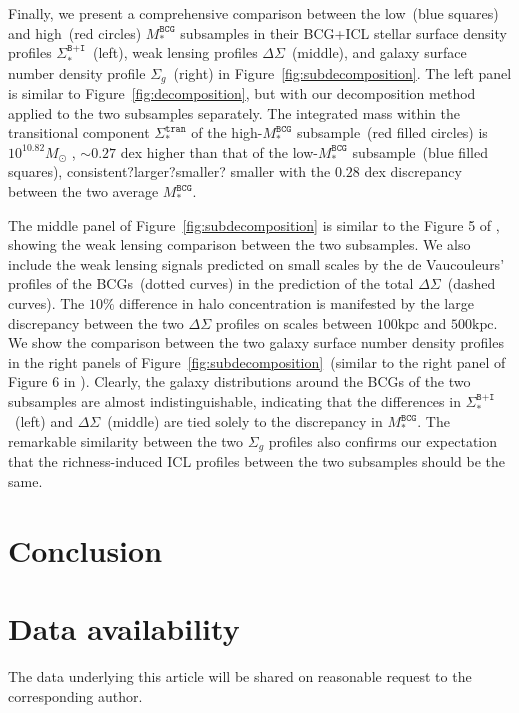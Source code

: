 \documentclass[fleqn,usenatbib]{mnras}
\newcommand{\sigbi}{\Sigma_*^{\texttt{B+I}}}
\newcommand{\sigg}{\Sigma_g}
\newcommand{\sigtr}{\Sigma_*^{\texttt{tran}}}
\newcommand{\msbcg}{M_*^{\texttt{BCG}}}
\newcommand{\kpc}{\mathrm{kpc}}
\newcommand{\msol}{M_{\odot}}
\newcommand{\ds}{\Delta\Sigma}
\newcommand\ying[1]{{\color{red} {#1}}}
\newcommand\xkchen[1]{{\color{cyan} {#1}}}
\begin{document}
Finally, we present a comprehensive comparison between the low~(blue
squares) and high~(red circles) $\msbcg$ subsamples in their BCG+ICL
stellar surface density profiles $\sigbi$~(left), weak lensing profiles
$\ds$~(middle), and galaxy surface number density profile $\sigg$~(right)
in Figure~\ref{fig:subdecomposition}. The left panel is similar to
Figure~\ref{fig:decomposition}, but with our decomposition method applied
to the two subsamples separately.  The integrated mass within the
transitional component $\sigtr$ of the high-$\msbcg$ subsample~(red filled
circles) is \xkchen{$10^{10.82}\msol$} , \xkchen{${\sim}0.27$} dex higher than that of the low-$\msbcg$
subsample~(blue filled squares), \ying{consistent?larger?smaller?}\xkchen{smaller} with the
\xkchen{$0.28$} dex discrepancy between the two average $\msbcg$.



The middle panel of Figure~\ref{fig:subdecomposition} is similar to the
Figure 5 of , showing the weak lensing comparison
between the two subsamples. We also include the weak lensing signals
predicted on small scales by the de Vaucouleurs' profiles of the
BCGs~(dotted curves) in the prediction of the total
$\ds$~(dashed curves). The $10\%$ difference in halo concentration is
manifested by the large discrepancy between the two $\ds$ profiles on
scales between $100\kpc$ and $500\kpc$. We show the comparison between the
two galaxy surface number density profiles in the right panels of
Figure~\ref{fig:subdecomposition}~(similar to the right panel of Figure 6
in ). Clearly, the galaxy distributions around the BCGs
of the two subsamples are almost indistinguishable, indicating that the
differences in $\sigbi$~(left) and $\ds$~(middle) are tied solely to the
discrepancy in $\msbcg$. The remarkable similarity between the two $\sigg$
profiles also confirms our expectation that the richness-induced ICL
profiles between the two subsamples should be the same.


\section{Conclusion}
\label{sec:conc}

\section*{Data availability}

The data underlying this article will be shared on reasonable request to the corresponding author.
\end{document}
